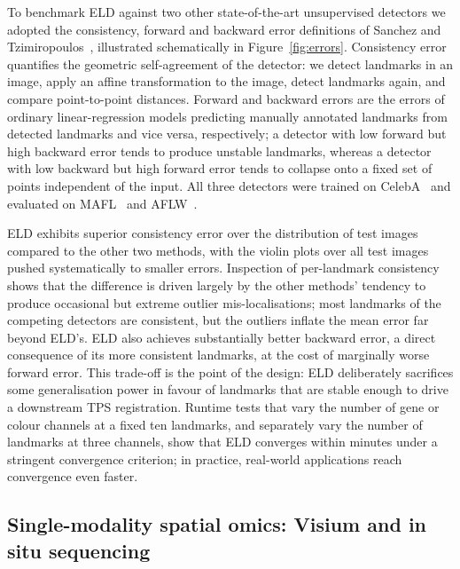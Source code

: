 \documentclass[11pt]{article}
\begin{document}
To benchmark ELD against two other state-of-the-art unsupervised detectors we adopted the consistency, forward and backward error definitions of Sanchez and Tzimiropoulos~\cite{sanchez2019object}, illustrated schematically in Figure~\ref{fig:errors}. Consistency error quantifies the geometric self-agreement of the detector: we detect landmarks in an image, apply an affine transformation to the image, detect landmarks again, and compare point-to-point distances. Forward and backward errors are the errors of ordinary linear-regression models predicting manually annotated landmarks from detected landmarks and vice versa, respectively; a detector with low forward but high backward error tends to produce unstable landmarks, whereas a detector with low backward but high forward error tends to collapse onto a fixed set of points independent of the input. All three detectors were trained on CelebA~\cite{liu2015celeba} and evaluated on MAFL~\cite{zhang2016learning} and AFLW~\cite{kostinger2011aflw}.

ELD exhibits superior consistency error over the distribution of test images compared to the other two methods, with the violin plots over all test images pushed systematically to smaller errors. Inspection of per-landmark consistency shows that the difference is driven largely by the other methods' tendency to produce occasional but extreme outlier mis-localisations; most landmarks of the competing detectors are consistent, but the outliers inflate the mean error far beyond ELD's. ELD also achieves substantially better backward error, a direct consequence of its more consistent landmarks, at the cost of marginally worse forward error. This trade-off is the point of the design: ELD deliberately sacrifices some generalisation power in favour of landmarks that are stable enough to drive a downstream TPS registration. Runtime tests that vary the number of gene or colour channels at a fixed ten landmarks, and separately vary the number of landmarks at three channels, show that ELD converges within minutes under a stringent convergence criterion; in practice, real-world applications reach convergence even faster.

\subsection{Single-modality spatial omics: Visium and in situ sequencing}
\end{document}
